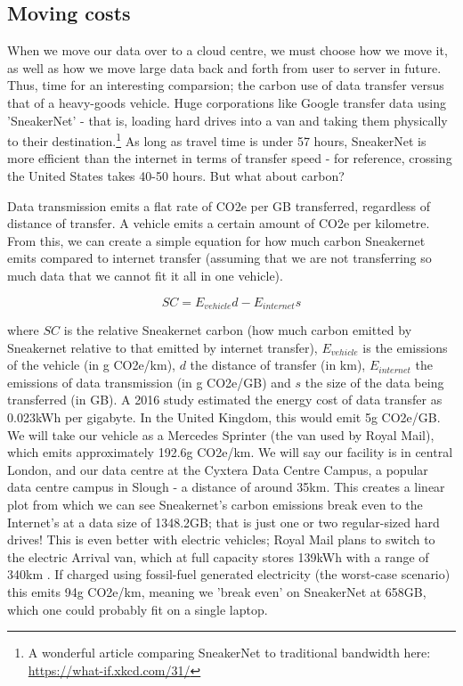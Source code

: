 \documentclass{article}
\begin{document}
\subsection{Moving costs}
When we move our data over to a cloud centre, we must choose how we move it, as well as how we move large data back and forth from user to server in future. Thus, time for an interesting comparsion; the carbon use of data transfer versus that of a heavy-goods vehicle. Huge corporations like Google transfer data using 'SneakerNet' - that is, loading hard drives into a van and taking them physically to their destination.\footnote{A wonderful article comparing SneakerNet to traditional bandwidth here: \href{https://what-if.xkcd.com/31/}{https://what-if.xkcd.com/31/}} As long as travel time is under 57 hours, SneakerNet is more efficient than the internet in terms of transfer speed \citep{jaya2020sneakernet} - for reference, crossing the United States takes 40-50 hours. But what about carbon? \newline

Data transmission emits a flat rate of CO2e per GB transferred, regardless of distance of transfer. A vehicle emits a certain amount of CO2e per kilometre. From this, we can create a simple equation for how much carbon Sneakernet emits compared to internet transfer (assuming that we are not transferring so much data that we cannot fit it all in one vehicle).

$$SC = E_{vehicle}d - E_{internet}s$$

where $SC$ is the relative Sneakernet carbon (how much carbon emitted by Sneakernet relative to that emitted by internet transfer), $E_{vehicle}$ is the emissions of the vehicle (in g CO2e/km), $d$ the distance of transfer (in km), $E_{internet}$ the emissions of data transmission (in g CO2e/GB) and $s$ the size of the data being transferred (in GB). A 2016 study estimated the energy cost of data transfer as 0.023kWh per gigabyte. \citep{aslan2018electricity} In the United Kingdom, this would emit 5g CO2e/GB. We will take our vehicle as a Mercedes Sprinter (the van used by Royal Mail), which emits approximately 192.6g CO2e/km. \citep{mercedes2019sprinter} We will say our facility is in central London, and our data centre at the Cyxtera Data Centre Campus, a popular data centre campus in Slough - a distance of around 35km. This creates a linear plot from which we can see Sneakernet's carbon emissions break even to the Internet's at a data size of 1348.2GB; that is just one or two regular-sized hard drives! This is even better with electric vehicles; Royal Mail plans to switch to the electric Arrival van, which at full capacity stores 139kWh with a range of 340km \citep{hubbard2021new}. If charged using fossil-fuel generated electricity (the worst-case scenario) this emits 94g CO2e/km, meaning we 'break even' on SneakerNet at 658GB, which one could probably fit on a single laptop. \newline
\end{document}

